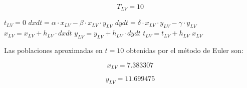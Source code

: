 \documentclass{article}
\begin{document}
\begin{equation}
    T_{LV} = 10
    \label{eq:calc:Tlv}
\end{equation}

\begin{algorithm}
\caption{Euler expl\'{\i}cito para el sistema de Lotka-Volterra}
\label{alg:calc:xlv}
\begin{algorithmic}
    \STATE $t_{LV} = 0$
        \STATE $dxdt = \alpha \cdot x_{LV} - \beta \cdot x_{LV} \cdot y_{LV}$
        \STATE $dydt = \delta \cdot x_{LV} \cdot y_{LV} - \gamma \cdot y_{LV}$
        \STATE $x_{LV} = x_{LV} + h_{LV} \cdot dxdt$
        \STATE $y_{LV} = y_{LV} + h_{LV} \cdot dydt$
        \STATE $t_{LV} = t_{LV} + h_{LV}$
    \ENDWHILE
    \RETURN $x_{LV}$
\end{algorithmic}
\end{algorithm}

Las poblaciones aproximadas en $t = 10$ obtenidas por el m\'etodo de Euler son:

\begin{equation}
    x_{LV} =
    7.383307
    \label{eq:res:xlv}
\end{equation}

\begin{equation}
    y_{LV} =
    11.699475
    \label{eq:res:ylv}
\end{equation}
\end{document}
